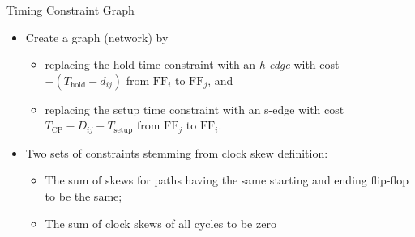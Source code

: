 \documentclass[10pt,ignorenonframetext,mathserif]{beamer}
\providecommand{\tightlist}{%
  \setlength{\itemsep}{0pt}\setlength{\parskip}{0pt}}
\begin{document}
\begin{frame}{Timing Constraint Graph}

\begin{itemize}
\tightlist
\item
  Create a graph (network) by

  \begin{itemize}
  \tightlist
  \item
    replacing the hold time constraint with an \emph{h-edge} with cost
    \(-(T_\text{hold} - d_{ij})\) from \(\text{FF}_i\) to \(\text{FF}_j\), and
  \item
    replacing the setup time constraint with an s-edge with cost
    \(T_\text{CP} - D_{ij} - T_\text{setup}\) from \(\text{FF}_j\) to \(\text{FF}_i\).
  \end{itemize}
\item
  Two sets of constraints stemming from clock skew definition:

  \begin{itemize}
  \tightlist
  \item
    The sum of skews for paths having the same starting and ending
    flip-flop to be the same;
  \item
    The sum of clock skews of all cycles to be zero
  \end{itemize}
\end{itemize}

\end{frame}
\end{document}
